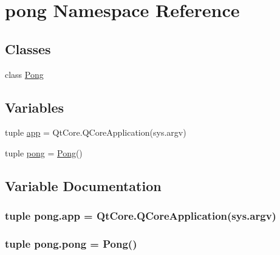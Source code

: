 \hypertarget{namespacepong}{}\section{pong Namespace Reference}
\label{namespacepong}
\subsection*{Classes}
\begin{DoxyCompactItemize}
\item 
class \hyperlink{classpong_1_1Pong}{Pong}
\end{DoxyCompactItemize}
\subsection*{Variables}
\begin{DoxyCompactItemize}
\item 
tuple \hyperlink{namespacepong_a5890e3e15b271f31f7ea36fea842a8f1}{app} = Qt\+Core.\+Q\+Core\+Application(sys.\+argv)
\item 
tuple \hyperlink{namespacepong_a4cdafb308f84df4c89fbafcbaf60551f}{pong} = \hyperlink{classpong_1_1Pong}{Pong}()
\end{DoxyCompactItemize}


\subsection{Variable Documentation}
\hypertarget{namespacepong_a5890e3e15b271f31f7ea36fea842a8f1}{}
\subsubsection[{app}]{\setlength{\rightskip}{0pt plus 5cm}tuple pong.\+app = Qt\+Core.\+Q\+Core\+Application(sys.\+argv)}\label{namespacepong_a5890e3e15b271f31f7ea36fea842a8f1}
\hypertarget{namespacepong_a4cdafb308f84df4c89fbafcbaf60551f}{}
\subsubsection[{pong}]{\setlength{\rightskip}{0pt plus 5cm}tuple pong.\+pong = {\bf Pong}()}\label{namespacepong_a4cdafb308f84df4c89fbafcbaf60551f}
